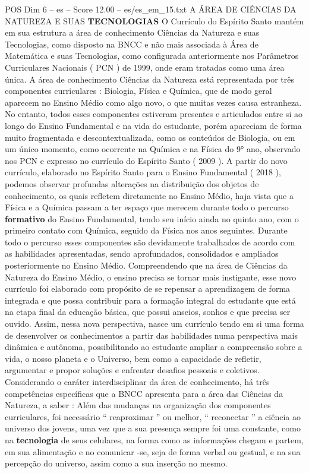 \begin{textsample}{POS Dim 6 – es – Score 12.00 – es/es\_em\_15.txt}  \label{ex:f6_pos_141}
A ÁREA DE CIÊNCIAS DA NATUREZA E SUAS \textbf{TECNOLOGIAS} O Currículo do Espírito Santo mantém em sua estrutura a área de conhecimento Ciências da Natureza e suas Tecnologias, como disposto na BNCC e não mais associada à Área de Matemática e suas Tecnologias, como configurada anteriormente nos Parâmetros Curriculares Nacionais ( PCN ) de 1999, onde eram tratadas como uma área única.
A área de conhecimento Ciências da Natureza está representada por três componentes curriculares : Biologia, Física e Química, que de modo geral aparecem no Ensino Médio como algo novo, o que muitas vezes causa estranheza.
No entanto, todos esses componentes estiveram presentes e articulados entre si ao longo do Ensino Fundamental e na vida do estudante, porém apareciam de forma muito fragmentada e descontextualizada, como os conteúdos de Biologia, ou em um único momento, como ocorrente na Química e na Física do 9{\EmojiFont °} ano, observado nos PCN e expresso no currículo do Espírito Santo ( 2009 ).
A partir do novo currículo, elaborado no Espírito Santo para o Ensino Fundamental ( 2018 ), podemos observar profundas alterações na distribuição dos objetos de conhecimento, os quais refletem diretamente no Ensino Médio, haja vista que a Física e a Química passam a ter espaço que merecem durante todo o percurso \textbf{formativo} do Ensino Fundamental, tendo seu início ainda no quinto ano, com o primeiro contato com Química, seguido da Física nos anos seguintes.
Durante todo o percurso esses componentes são devidamente trabalhados de acordo com as habilidades apresentadas, sendo aprofundados, consolidados e ampliados posteriormente no Ensino Médio.
Compreendendo que na área de Ciências da Natureza do Ensino Médio, o ensino precisa se tornar mais instigante, esse novo currículo foi elaborado com propósito de se repensar a aprendizagem de forma integrada e que possa contribuir para a formação integral do estudante que está na etapa final da educação básica, que possui anseios, sonhos e que precisa ser ouvido.
Assim, nessa nova perspectiva, nasce um currículo tendo em si uma forma de desenvolver os conhecimentos a partir das habilidades numa perspectiva mais dinâmica e autônoma, possibilitando ao estudante ampliar a compreensão sobre a vida, o nosso planeta e o Universo, bem como a capacidade de refletir, argumentar e propor soluções e enfrentar desafios pessoais e coletivos.
Considerando o caráter interdisciplinar da área de conhecimento, há três competências específicas que a BNCC apresenta para a área das Ciências da Natureza, a saber : Além das mudanças na organização dos componentes curriculares, foi necessário “ reaproximar ” ou melhor, “ reconectar ” a ciência ao universo dos jovens, uma vez que a sua presença sempre foi uma constante, como na \textbf{tecnologia} de seus celulares, na forma como as informações chegam e partem, em sua alimentação e no comunicar -se, seja de forma verbal ou gestual, e na sua percepção do universo, assim como a sua inserção no mesmo.

\end{textsample}

